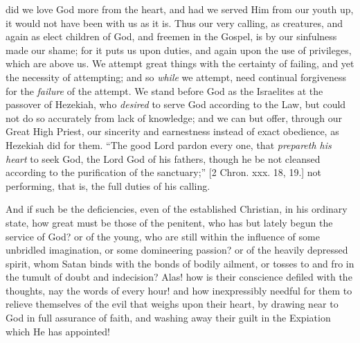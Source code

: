 did we love God more from the heart, and had we served
Him from our youth up, it would not have been with us as
it is. Thus our very calling, as creatures, and again as
elect children of God, and freemen in the Gospel, is by
our sinfulness made our shame; for it puts us upon
duties, and again upon the use of privileges, which are
above us. We attempt great things with the certainty of
failing, and yet the necessity of attempting; and so \emph{while}
we attempt, need continual forgiveness for the \emph{failure}
of the attempt. We stand before God as the Israelites at
the passover of Hezekiah, who \emph{desired} to serve God
according to the Law, but could not do so accurately from
lack of knowledge; and we can but offer, through our
Great High Priest, our sincerity and earnestness instead
of exact obedience, as Hezekiah did for them. ``The
good Lord pardon every one, that \emph{prepareth his heart}
to seek God, the Lord God of his fathers, though he be
not cleansed according to the purification of the
sanctuary;'' [2 Chron. xxx. 18, 19.] not performing,
that is, the full duties of his calling.

And if such be the deficiencies, even of the
established Christian, in his ordinary state, how great
must be those of the penitent, who has but lately begun
the service of God? or of the young, who are still within
the influence of some unbridled imagination, or some
domineering passion? or of the heavily depressed spirit,
whom Satan binds with the bonds of bodily ailment, or
tosses to and fro in the tumult of doubt and indecision?
Alas! how is their conscience defiled with the thoughts,
nay the words of every hour! and how inexpressibly
needful for them to relieve themselves of the evil that
weighs upon their heart, by drawing near to God in full
assurance of faith, and washing away their guilt in the
Expiation which He has appointed!


